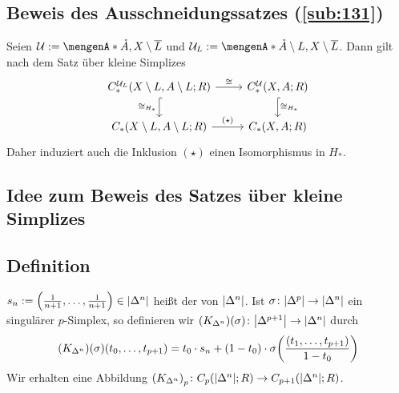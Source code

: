 \subsection{Beweis des Ausschneidungssatzes (\ref{sub:131})} %
\label{sub:135}
Seien $\mathcal{U} := \set{\mathring{A},X \setminus \overline{L}}$ und $\mathcal{U}_L := \set{\mathring{A} \setminus L, X \setminus \overline{L}}$. Dann gilt nach
dem Satz über kleine Simplizes
\[
	\begin{tikzcd}
		C_*^{\mathcal{U}_L} \enbrace*{X \setminus L, A \setminus L;R} \rar["\cong"] \dar[hook,"\cong_{H_*}"']
		& C_*^\mathcal{U}(X,A;R) \dar[hook,"\cong_{H_*}"] \\
		C_*(X \setminus L, A \setminus L;R) \rar["(\star)"] & C_*(X,A;R)
	\end{tikzcd}
\]
Daher induziert auch die Inklusion $(\star)$ einen Isomorphismus in $H_*$. \bewende

\subsection{Idee zum Beweis des Satzes über kleine Simplizes} %
\label{sub:136}

\subsection[Definition: Schwerpunkt und \enquote{Abkegeln}]{Definition} %
\label{sub:137}
$s_n := \enbrace*{\frac{1}{n+1}, \ldots , \frac{1}{n+1}} \in \abs*{\Delta^n}$ heißt der  von $\abs*{\Delta^n}$. Ist 
$\sigma \colon \abs*{\Delta^p} \to \abs*{\Delta^n}$ ein singulärer $p$-Simplex, so definieren wir $(K_{\Delta^n})(\sigma) \colon \abs*{\Delta^{p+1}} \to \abs*{\Delta^n}$ 
durch 
\[
	\enbrace*{K_{\Delta^n}} (\sigma) \enbrace*{t_0, \ldots , t_{p+1}} = t_0 \cdot s_n + (1-t_0) \cdot \sigma \enbrace*{\frac{(t_1,\ldots ,t_{p+1})}{1-t_0}} 
\]
Wir erhalten eine Abbildung $\enbrace*{K_{\Delta^n}}_p \colon C_p \enbrace*{\abs*{\Delta^n};R} \to C_{p+1} \enbrace*{\abs*{\Delta^n};R}$.

